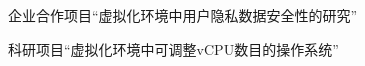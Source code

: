 
\begin{projects}{99}

    \item 企业合作项目“虚拟化环境中用户隐私数据安全性的研究”
    \item 科研项目“虚拟化环境中可调整vCPU数目的操作系统”
    
\end{projects}
